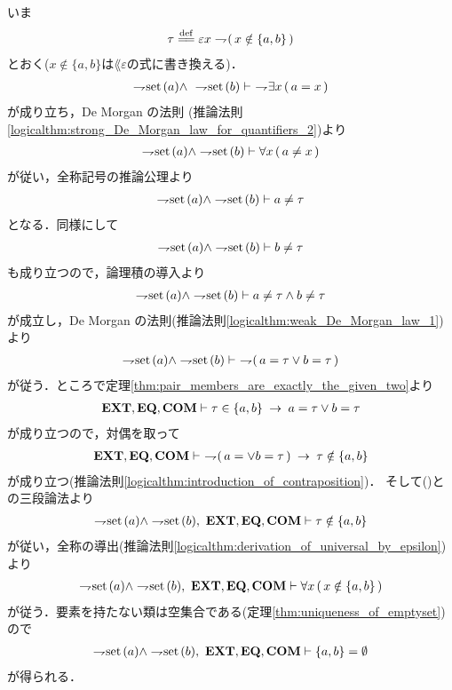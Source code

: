 	\begin{sketch}
		いま
		\begin{align}
			\tau \defeq \varepsilon x \negation (\, x \notin \{a,b\}\, )
		\end{align}
		とおく($x \notin \{a,b\}$は$\lang{\varepsilon}$の式に書き換える)．
		\begin{align}
			\rightharpoondown\hspace{-0.25em} \operatorname*{set}\hspace{0.15em}(a) \wedge\ \rightharpoondown\hspace{-0.25em} \operatorname*{set}\hspace{0.15em}(b)
			\vdash\ \rightharpoondown\hspace{-0.25em} \exists x\, (\, a = x\, )
		\end{align}
		が成り立ち，De Morgan の法則
		(推論法則\ref{logicalthm:strong_De_Morgan_law_for_quantifiers_2})より
		\begin{align}
			\rightharpoondown\hspace{-0.25em} \operatorname*{set}\hspace{0.15em}(a) \wedge \rightharpoondown\hspace{-0.25em} \operatorname*{set}\hspace{0.15em}(b)
			\vdash \forall x\, (\, a \neq x\, )
		\end{align}
		が従い，全称記号の推論公理より
		\begin{align}
			\rightharpoondown\hspace{-0.25em} \operatorname*{set}\hspace{0.15em}(a) \wedge \rightharpoondown\hspace{-0.25em} \operatorname*{set}\hspace{0.15em}(b) \vdash a \neq \tau
		\end{align}
		となる．同様にして
		\begin{align}
			\rightharpoondown\hspace{-0.25em} \operatorname*{set}\hspace{0.15em}(a) \wedge \rightharpoondown\hspace{-0.25em} \operatorname*{set}\hspace{0.15em}(b) \vdash b \neq \tau
		\end{align}
		も成り立つので，論理積の導入より
		\begin{align}
			\rightharpoondown\hspace{-0.25em} \operatorname*{set}\hspace{0.15em}(a) \wedge \rightharpoondown\hspace{-0.25em} \operatorname*{set}\hspace{0.15em}(b) \vdash
			a \neq \tau \wedge b \neq \tau
		\end{align}
		が成立し，De Morgan の法則(推論法則\ref{logicalthm:weak_De_Morgan_law_1})より
		\begin{align}
			\negation \set{a} \wedge \negation \set{b} \vdash\ 
			\negation (\, a = \tau \vee b = \tau\, )
			\label{fom:pair_of_proper_classes_is_emptyset_1}
		\end{align}
		が従う．ところで定理\ref{thm:pair_members_are_exactly_the_given_two}より
		\begin{align}
			\mbox{{\bf EXT}},\mbox{{\bf EQ}},\mbox{\bf COM} \vdash \tau \in \{a,b\} \hspace{0.25em}\rightarrow\hspace{0.25em} a = \tau \vee b = \tau
		\end{align}
		が成り立つので，対偶を取って
		\begin{align}
			\EXTAX,\EQAX,\COMAX \vdash\ 
			\negation (\, a = \vee b = \tau\, ) \rarrow \tau \notin \{a,b\}
		\end{align}
		が成り立つ(推論法則\ref{logicalthm:introduction_of_contraposition})．
		そして()との三段論法より
		\begin{align}
			\negation \set{a} \wedge \negation \set{b},\ \EXTAX,\EQAX,\COMAX \vdash
			\tau \notin \{a,b\}
		\end{align}
		が従い，全称の導出(推論法則\ref{logicalthm:derivation_of_universal_by_epsilon})より
		\begin{align}
			\negation \set{a} \wedge \negation \set{b},\ \EXTAX,\EQAX,\COMAX \vdash
			\forall x\, (\, x \notin \{a,b\}\, )
		\end{align}
		が従う．要素を持たない類は空集合である(定理\ref{thm:uniqueness_of_emptyset})ので
		\begin{align}
			\negation \set{a} \wedge \negation \set{b},\ \EXTAX,\EQAX,\COMAX \vdash
			\{a,b\} = \emptyset
		\end{align}
		が得られる．
		\QED
	\end{sketch}
	
